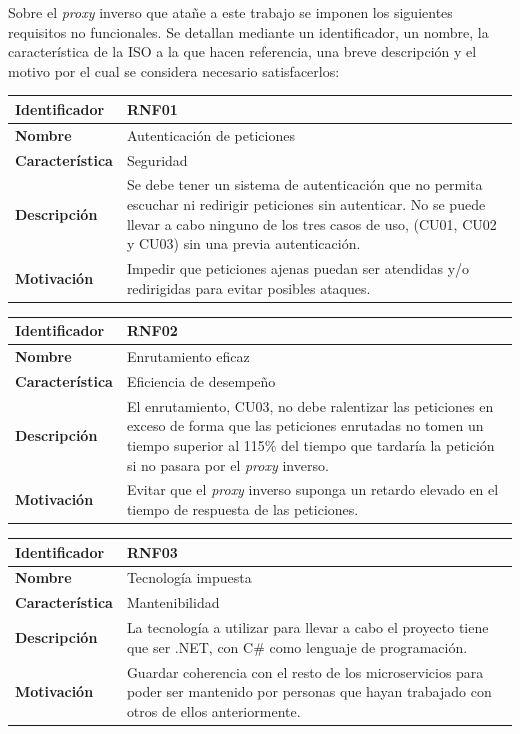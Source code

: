 \documentclass[11pt,spanish,listoffigures]{tfgetsinf}
\begin{document}
Sobre el \emph{proxy} inverso que atañe a este trabajo se imponen los siguientes requisitos no funcionales. Se detallan mediante un identificador, un nombre, la característica de la ISO a la que hacen referencia, una breve descripción y el motivo por el cual se considera necesario satisfacerlos:

\begin{center} \begin{tabular}{| l | p{11.3cm} |}
\hline
\textbf{Identificador} & RNF01
\\ \hline
\textbf{Nombre} & Autenticación de peticiones
\\ \hline
\textbf{Característica} & Seguridad
\\ \hline
\textbf{Descripción} & Se debe tener un sistema de autenticación que no permita escuchar ni redirigir peticiones sin autenticar. No se puede llevar a cabo ninguno de los tres casos de uso, (CU01, CU02 y CU03) sin una previa autenticación.
\\ \hline
\textbf{Motivación} & Impedir que peticiones ajenas puedan ser atendidas y/o redirigidas para evitar posibles ataques.
\\ \hline \end{tabular} \end{center}

\begin{center} \begin{tabular}{| l | p{11.3cm} |}
\hline
\textbf{Identificador} & RNF02
\\ \hline
\textbf{Nombre} & Enrutamiento eficaz
\\ \hline
\textbf{Característica} & Eficiencia de desempeño
\\ \hline
\textbf{Descripción} & El enrutamiento, CU03, no debe ralentizar las peticiones en exceso de forma que las peticiones enrutadas no tomen un tiempo superior al 115\% del tiempo que tardaría la petición si no pasara por el \emph{proxy} inverso.
\\ \hline
\textbf{Motivación} & Evitar que el \emph{proxy} inverso suponga un retardo elevado en el tiempo de respuesta de las peticiones.
\\ \hline \end{tabular} \end{center}

\begin{center} \begin{tabular}{| l | p{11.3cm} |}
\hline
\textbf{Identificador} & RNF03
\\ \hline
\textbf{Nombre} & Tecnología impuesta
\\ \hline
\textbf{Característica} & Mantenibilidad
\\ \hline
\textbf{Descripción} & La tecnología a utilizar para llevar a cabo el proyecto tiene que ser .NET, con C\# como lenguaje de programación.
\\ \hline
\textbf{Motivación} & Guardar coherencia con el resto de los microservicios para poder ser mantenido por personas que hayan trabajado con otros de ellos anteriormente.
\\ \hline \end{tabular} \end{center}
\end{document}

